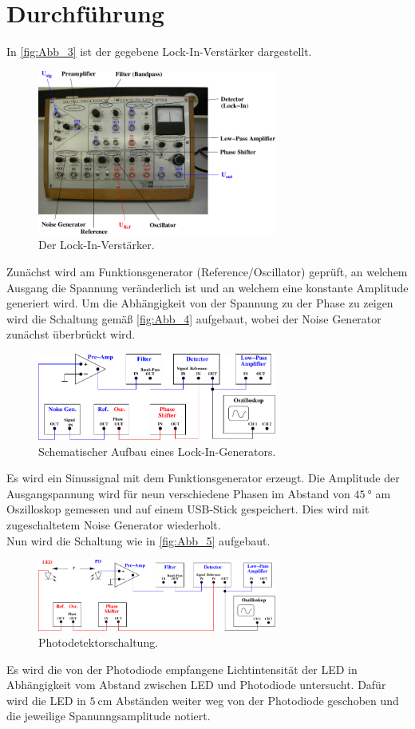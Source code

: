 \section{Durchführung}
\label{sec:Durchführung}

In \autoref{fig:Abb_3} ist der gegebene Lock-In-Verstärker dargestellt.
\begin{figure}[H]
    \centering
    \includegraphics[width=0.7\textwidth]{build/Abb_3.pdf}
    \caption {Der Lock-In-Verstärker.\cite{V303}}
    \label{fig:Abb_3}
\end{figure}
Zunächst wird am Funktionsgenerator (Reference/Oscillator) geprüft, an welchem Ausgang die Spannung veränderlich ist und an welchem eine konstante Amplitude generiert wird.
Um die Abhängigkeit von der Spannung zu der Phase zu zeigen wird die Schaltung gemäß \autoref{fig:Abb_4} aufgebaut, wobei der Noise Generator zunächst überbrückt wird.
\begin{figure}[H]
    \centering
    \includegraphics[width=0.7\textwidth]{build/Abb_4.pdf}
    \caption {Schematischer Aufbau eines Lock-In-Generators.\cite{V303}}
    \label{fig:Abb_4}
\end{figure}
Es wird ein Sinussignal mit dem Funktionsgenerator erzeugt.
Die Amplitude der Ausgangspannung wird für neun verschiedene Phasen im Abstand von $\qty{45}{\degree}$ am Oszilloskop gemessen und auf einem USB-Stick gespeichert.
Dies wird mit zugeschaltetem Noise Generator wiederholt.\\
Nun wird die Schaltung wie in \autoref{fig:Abb_5} aufgebaut.
\begin{figure}[H]
    \centering
    \includegraphics[width=0.7\textwidth]{build/Abb_5.pdf}
    \caption {Photodetektorschaltung.\cite{V303}}
    \label{fig:Abb_5}
\end{figure}
Es wird die von der Photodiode empfangene Lichtintensität der LED in Abhängigkeit vom Abstand zwischen LED und Photodiode untersucht.
Dafür wird die LED in $\qty{5}{\centi\meter}$ Abständen weiter weg von der Photodiode geschoben und die jeweilige Spanunngsamplitude notiert.

